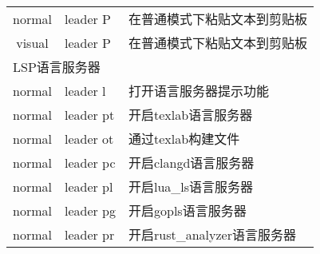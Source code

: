 \documentclass[11pt]{article}
\begin{document}
\begin{left}
\begin{tabular}{|c|l|l|}
    normal & leader P & 在普通模式下粘贴文本到剪贴板 \\
    visual & leader P & 在普通模式下粘贴文本到剪贴板 \\
    \hline \multicolumn{3}{|l|}{LSP语言服务器} \\ \hline                    
    normal & leader l & 打开语言服务器提示功能 \\        
    normal & leader pt & 开启texlab语言服务器 \\
    normal & leader ot & 通过texlab构建文件 \\    
    normal & leader pc & 开启clangd语言服务器 \\
    normal & leader pl & 开启lua_ls语言服务器 \\
    normal & leader pg & 开启gopls语言服务器 \\
    normal & leader pr & 开启rust_analyzer语言服务器 \\
    \hline
  \end{tabular}  
\end{left}
\end{document}
